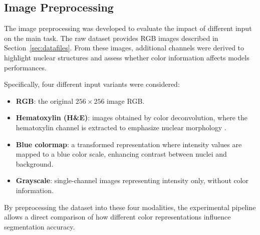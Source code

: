 \documentclass[target=bach,aauheader=,style=]{thud}
\begin{document}
\subsection{Image Preprocessing}
The image preprocessing was developed to evaluate the impact of different input on the main task. 
The raw dataset provides RGB images described in Section~\ref{sec:datafiles}. 
From these images, additional channels were derived to highlight nuclear structures and assess whether color information affects models performances. 

Specifically, four different input variants were considered:

\begin{itemize}
    \item \textbf{RGB}: the original $256 \times 256$ image RGB.
    \item \textbf{Hematoxylin (H\&E)}: images obtained by color deconvolution, where the hematoxylin channel is extracted to emphasize nuclear morphology \cite{ruifrok2001quantification}.
    \item \textbf{Blue colormap}: a transformed representation where intensity values are mapped to a blue color scale, enhancing contrast between nuclei and background.
    \item \textbf{Grayscale}: single-channel images representing intensity only, without color information.
\end{itemize}
By preprocessing the dataset into these four modalities, the experimental pipeline allows a direct comparison of how different color representations influence segmentation accuracy. 
\end{document}
